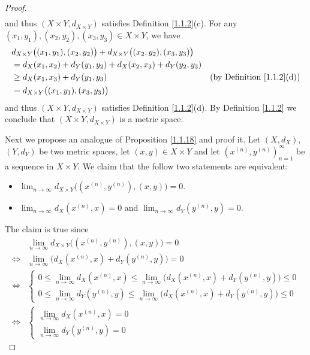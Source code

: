 \begin{proof}
\begin{align*}
    \end{align*}
    and thus \((X \times Y, d_{X \times Y})\) satisfies Definition \ref{1.1.2}(c).
    For any \((x_1, y_1), (x_2, y_2), (x_3, y_3) \in X \times Y\), we have
    \begin{align*}
         & d_{X \times Y}\big((x_1, y_1), (x_2, y_2)\big) + d_{X \times Y}\big((x_2, y_2), (x_3, y_3)\big)                                         \\
         & = d_X(x_1, x_2) + d_Y(y_1, y_2) + d_X(x_2, x_3) + d_Y(y_2, y_3)                                                                         \\
         & \geq d_X(x_1, x_3) + d_Y(y_1, y_3)                                                              & \text{(by Definition \ref{1.1.2}(d))} \\
         & = d_{X \times Y}\big((x_1, y_1), (x_3, y_3)\big)
    \end{align*}
    and thus \((X \times Y, d_{X \times Y})\) satisfies Definition \ref{1.1.2}(d).
    By Definition \ref{1.1.2} we conclude that \((X \times Y, d_{X \times Y})\) is a metric space.

    Next we propose an analogue of Proposition \ref{1.1.18} and proof it.
    Let \((X, d_X)\), \((Y, d_Y)\) be two metric spaces, let \((x, y) \in X \times Y\) and let \((x^{(n)}, y^{(n)})_{n = 1}^\infty\) be a sequence in \(X \times Y\).
    We claim that the follow two statements are equivalent:
    \begin{itemize}
        \item \(\lim_{n \to \infty} d_{X \times Y}\big((x^{(n)}, y^{(n)}), (x, y)\big) = 0\).
        \item \(\lim_{n \to \infty} d_X(x^{(n)}, x) = 0\) and \(\lim_{n \to \infty} d_Y(y^{(n)}, y) = 0\).
    \end{itemize}
    The claim is true since
    \begin{align*}
             & \lim_{n \to \infty} d_{X \times Y}\big((x^{(n)}, y^{(n)}), (x, y)\big) = 0 \\
        \iff & \lim_{n \to \infty} \big(d_X(x^{(n)}, x) + d_Y(y^{(n)}, y)\big) = 0        \\
        \iff & \begin{cases}
            0 \leq \lim_{n \to \infty} d_X(x^{(n)}, x) \leq \lim_{n \to \infty} \big(d_X(x^{(n)}, x) + d_Y(y^{(n)}, y)\big) \leq 0 \\
            0 \leq \lim_{n \to \infty} d_Y(y^{(n)}, y) \leq \lim_{n \to \infty} \big(d_X(x^{(n)}, x) + d_Y(y^{(n)}, y)\big) \leq 0
        \end{cases}                                                 \\
        \iff & \begin{cases}
            \lim_{n \to \infty} d_X(x^{(n)}, x) = 0 \\
            \lim_{n \to \infty} d_Y(y^{(n)}, y) = 0
        \end{cases}
    \end{align*}


\end{proof}
